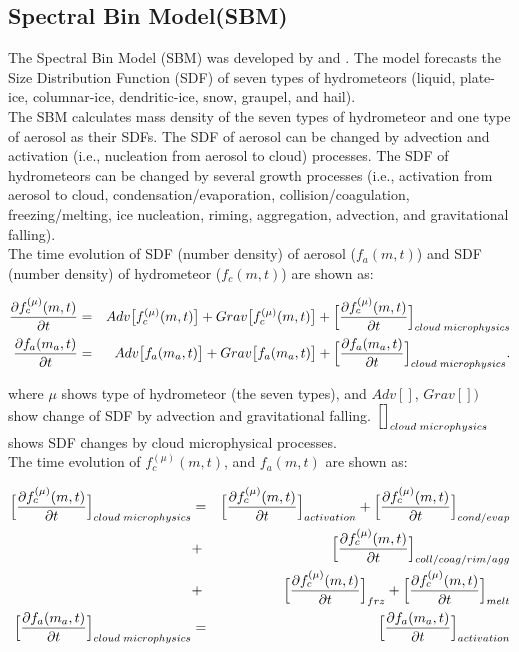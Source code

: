 \subsection{Spectral Bin Model(SBM)}
The Spectral Bin Model (SBM) was developed by \cite{suzuki_2006} and \cite{suzuki_etal_2010}. The model forecasts the Size Distribution Function (SDF) of seven types of hydrometeors (liquid, plate-ice, columnar-ice, dendritic-ice, snow, graupel, and hail). \\
The SBM calculates mass density of the seven types of hydrometeor and one type of aerosol as their SDFs. The SDF of aerosol can be changed by advection and activation (i.e., nucleation from aerosol to cloud) processes. The SDF of hydrometeors can be changed by several growth processes (i.e., activation from aerosol to cloud, condensation/evaporation, collision/coagulation, freezing/melting, ice nucleation, riming, aggregation, advection, and gravitational falling). \\
The time evolution of SDF (number density) of aerosol ($f_{a}(m,t)$) and SDF (number density) of hydrometeor ($f_{c}(m,t)$) are shown as:

\begin{eqnarray}
\frac{\partial f^{(\mu)}_{c}(m,t)}{\partial t}&=&Adv\bigl[f^{(\mu)}_{c}(m,t)\bigr]+Grav\bigl[f^{(\mu)}_{c}(m,t)\bigr]+\Bigl[ \frac{\partial f^{(\mu)}_{c}(m,t)}{\partial t}\Bigr ]_{cloud\;microphysics}\label{s10-1}\\
\frac{\partial f_{a}(m_{a},t)}{\partial t}&=&Adv\bigl[f_{a}(m_{a},t)\bigr]+Grav\bigl[f_{a}(m_{a},t)\bigr]+\Bigl[ \frac{\partial f_{a}(m_{a},t)}{\partial t} \Bigr ]_{cloud\;microphysics}.\label{s10-2}
\end{eqnarray}

where $\mu$ shows type of hydrometeor (the seven types), and $Adv[]$, $Grav[])$ show change of SDF by  advection and gravitational falling. $\Bigl[ \Bigr]_{cloud\;microphysics}$ shows SDF changes by cloud microphysical processes.\\
The time evolution of $f_{c}^{(\mu)}(m,t)$, and $f_{a}(m,t)$ are shown as:

\begin{eqnarray}
\Bigl[ \frac{\partial f_{c}^{(\mu)}(m,t)}{\partial t}\Bigl]_{cloud\;microphysics}&=&\Bigl[\frac{\partial f_{c}^{(\mu)}(m,t)}{\partial t}\Bigr]_{activation}+\Bigl[\frac{\partial f_{c}^{(\mu)}(m,t)}{\partial t}\Bigr]_{cond/evap}\nonumber\\
&+&\Bigl[\frac{\partial f_{c}^{(\mu)}(m,t)}{\partial t}\Bigr]_{coll/coag/rim/agg}\nonumber\\
&+&\Bigl[\frac{\partial f_{c}^{(\mu)}(m,t)}{\partial t}\Bigr]_{frz}+\Bigl[\frac{\partial f_{c}^{(\mu)}(m,t)}{\partial t}\Bigr]_{melt}\nonumber\\
\Bigl[ \frac{\partial f_{a}(m_{a},t)}{\partial t}\Bigl]_{cloud\;microphysics}&=&\Bigl[\frac{\partial f_{a}(m_{a},t)}{\partial t}\Bigr]_{activation}\nonumber
\end{eqnarray}

